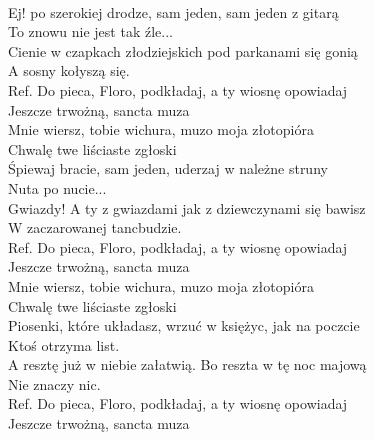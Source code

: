 
\begin{flushleft}
\tab{}\tab{}\\
Ej! po szerokiej drodze, sam jeden, sam jeden z gitarą  \\
To znowu nie jest tak źle... \tab{}\tab{}\\
Cienie w czapkach złodziejskich pod parkanami się gonią \\
A sosny kołyszą się. \tab{}\tab{}\\
\vskip 3mm
Ref. Do pieca, Floro, podkładaj, a ty wiosnę opowiadaj \\
\hspace{0.9cm}Jeszcze trwożną, sancta muza \tab{}\\
\hspace{0.9cm}Mnie wiersz, tobie wichura, muzo moja złotopióra  \\
\hspace{0.9cm}Chwalę twe liściaste zgłoski \tab{}\\
\vskip 3mm
Śpiewaj bracie, sam jeden, uderzaj w należne struny \\
Nuta po nucie... \\
Gwiazdy! A ty z gwiazdami jak z dziewczynami się bawisz \\
W zaczarowanej tancbudzie. \\
\vskip 3mm
Ref. Do pieca, Floro, podkładaj, a ty wiosnę opowiadaj \\
\hspace{0.9cm}Jeszcze trwożną, sancta muza \\
\hspace{0.9cm}Mnie wiersz, tobie wichura, muzo moja złotopióra \\
\hspace{0.9cm}Chwalę twe liściaste zgłoski \\
\vskip 3mm
Piosenki, które układasz, wrzuć w księżyc, jak na poczcie \\
Ktoś otrzyma list. \\
A resztę już w niebie załatwią. Bo reszta w tę noc majową \\
Nie znaczy nic.  \\
\vskip 3mm
Ref. Do pieca, Floro, podkładaj, a ty wiosnę opowiadaj \\ 
\hspace{0.9cm}Jeszcze trwożną, sancta muza \\

\end{flushleft}

